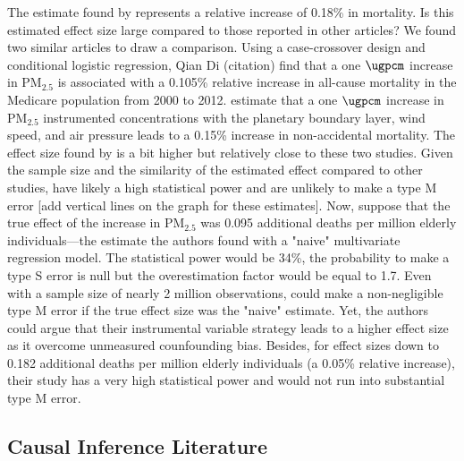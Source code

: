 \documentclass[12pt]{article}
\begin{document}
    
    The estimate found by \cite{deryugina_mortality_2019} represents a relative increase of 0.18\% in mortality. Is this estimated effect size large compared to those reported in other articles? We found two similar articles to draw a comparison. Using a case-crossover design and conditional logistic regression, Qian Di (citation) find that a one $\si{\ugpcm}$ increase in PM$_{2.5}$ is associated with a 0.105\% relative increase in all-cause mortality in the Medicare population from 2000 to 2012. \cite{schwartz_national_2018} estimate that a one $\si{\ugpcm}$ increase in PM$_{2.5}$ instrumented concentrations  with the planetary boundary layer, wind speed, and air pressure leads to a 0.15\% increase in non-accidental mortality. The effect size found by \cite{deryugina_mortality_2019} is a bit higher but relatively close to these two studies. Given the sample size and the similarity of the estimated effect compared to other studies, \cite{deryugina_mortality_2019} have likely a high statistical power and are unlikely to make a type M error [add vertical lines on the graph for these estimates]. Now, suppose that the true effect of the increase in PM$_{2.5}$ was 0.095 additional deaths per million elderly individuals---the estimate the authors found with a "naive" multivariate regression model. The statistical power would be 34\%, the probability to make a type S error is null but the overestimation factor would be equal to 1.7. Even with a sample size of nearly 2 million observations, \cite{deryugina_mortality_2019} could make a non-negligible type M error if the true effect size was the "naive" estimate. Yet, the authors could argue that their instrumental variable strategy leads to a higher effect size as it overcome unmeasured counfounding bias. Besides, for effect sizes down to 0.182 additional deaths per million elderly individuals (a 0.05\% relative increase), their study has a very high statistical power and would not run into substantial type M error.
    
    \subsection{Causal Inference Literature}
    
\end{document}
